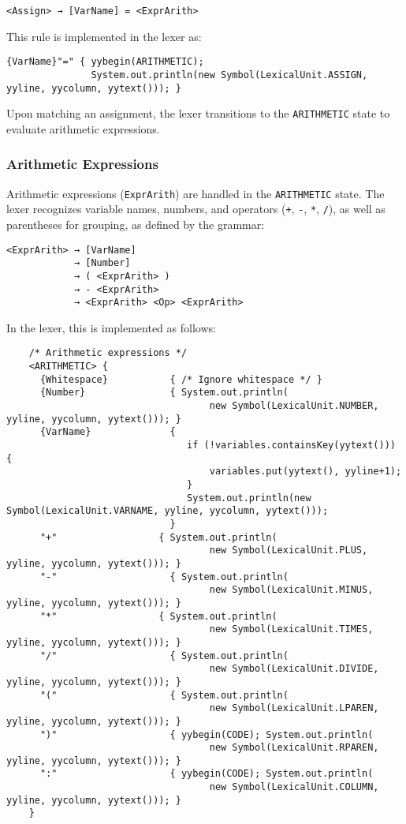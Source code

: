 \documentclass{article}
\begin{document}
	\begin{verbatim}
<Assign> → [VarName] = <ExprArith>
	\end{verbatim}

	This rule is implemented in the lexer as:

	\begin{verbatim}
{VarName}"=" { yybegin(ARITHMETIC);
               System.out.println(new Symbol(LexicalUnit.ASSIGN, yyline, yycolumn, yytext())); }
	\end{verbatim}

	Upon matching an assignment, the lexer transitions to the \texttt{ARITHMETIC} state to evaluate arithmetic expressions.

	\subsubsection{Arithmetic Expressions}
	Arithmetic expressions (\texttt{ExprArith}) are handled in the \texttt{ARITHMETIC} state. The lexer recognizes variable names, numbers, and operators (\texttt{+}, \texttt{-}, \texttt{*}, \texttt{/}), as well as parentheses for grouping, as defined by the grammar:

	\begin{verbatim}
<ExprArith> → [VarName]
			→ [Number]
			→ ( <ExprArith> )
			→ - <ExprArith>
			→ <ExprArith> <Op> <ExprArith>
	\end{verbatim}

	In the lexer, this is implemented as follows:

	\begin{verbatim}
	/* Arithmetic expressions */
	<ARITHMETIC> {
	  {Whitespace}           { /* Ignore whitespace */ }
	  {Number}               { System.out.println(
									new Symbol(LexicalUnit.NUMBER, yyline, yycolumn, yytext())); }
	  {VarName}              {
								if (!variables.containsKey(yytext())) {
									variables.put(yytext(), yyline+1);
								}
								System.out.println(new Symbol(LexicalUnit.VARNAME, yyline, yycolumn, yytext()));
							 }
	  "+"                  { System.out.println(
									new Symbol(LexicalUnit.PLUS, yyline, yycolumn, yytext())); }
	  "-"                    { System.out.println(
									new Symbol(LexicalUnit.MINUS, yyline, yycolumn, yytext())); }
	  "*"                  { System.out.println(
									new Symbol(LexicalUnit.TIMES, yyline, yycolumn, yytext())); }
	  "/"                    { System.out.println(
									new Symbol(LexicalUnit.DIVIDE, yyline, yycolumn, yytext())); }
	  "("                    { System.out.println(
									new Symbol(LexicalUnit.LPAREN, yyline, yycolumn, yytext())); }
	  ")"                    { yybegin(CODE); System.out.println(
									new Symbol(LexicalUnit.RPAREN, yyline, yycolumn, yytext())); }
	  ":"                    { yybegin(CODE); System.out.println(
									new Symbol(LexicalUnit.COLUMN, yyline, yycolumn, yytext())); }
	}

	\end{verbatim}
\end{document}
